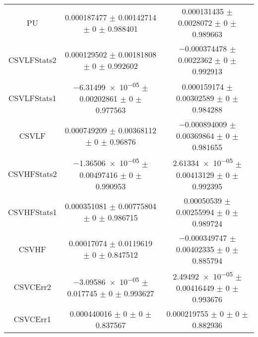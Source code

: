 \begin{table}
\begin{tabular}{ccc}
PU & \num{0.000187477} $\pm$ \num{0.00142714} $\pm$ \num{0} $\pm$ \num{0.988401} & \num{0.000131435} $\pm$ \num{0.0028072} $\pm$ \num{0} $\pm$ \num{0.989663}\\
CSVLFStats2 & \num{0.000129502} $\pm$ \num{0.00181808} $\pm$ \num{0} $\pm$ \num{0.992602} & \num{-0.000374478} $\pm$ \num{0.0022362} $\pm$ \num{0} $\pm$ \num{0.992913}\\
CSVLFStats1 & \num{-6.31499e-05} $\pm$ \num{0.00202861} $\pm$ \num{0} $\pm$ \num{0.977563} & \num{0.000159174} $\pm$ \num{0.00302589} $\pm$ \num{0} $\pm$ \num{0.984288}\\
CSVLF & \num{0.000749209} $\pm$ \num{0.00368112} $\pm$ \num{0} $\pm$ \num{0.96876} & \num{-0.000894009} $\pm$ \num{0.00369864} $\pm$ \num{0} $\pm$ \num{0.981655}\\
CSVHFStats2 & \num{-1.36506e-05} $\pm$ \num{0.00497416} $\pm$ \num{0} $\pm$ \num{0.990953} & \num{2.61334e-05} $\pm$ \num{0.00413129} $\pm$ \num{0} $\pm$ \num{0.992395}\\
CSVHFStats1 & \num{0.000351081} $\pm$ \num{0.00775804} $\pm$ \num{0} $\pm$ \num{0.986715} & \num{0.00050539} $\pm$ \num{0.00255994} $\pm$ \num{0} $\pm$ \num{0.989724}\\
CSVHF & \num{0.00017074} $\pm$ \num{0.0119619} $\pm$ \num{0} $\pm$ \num{0.847512} & \num{-0.000349747} $\pm$ \num{0.00402335} $\pm$ \num{0} $\pm$ \num{0.885794}\\
CSVCErr2 & \num{-3.09586e-05} $\pm$ \num{0.017745} $\pm$ \num{0} $\pm$ \num{0.993627} & \num{2.49492e-05} $\pm$ \num{0.00416449} $\pm$ \num{0} $\pm$ \num{0.993676}\\
CSVCErr1 & \num{0.000440016} $\pm$ \num{0} $\pm$ \num{0} $\pm$ \num{0.837567} & \num{0.000219755} $\pm$ \num{0} $\pm$ \num{0} $\pm$ \num{0.882936}\\
\bottomrule
\end{tabular}
\end{table}